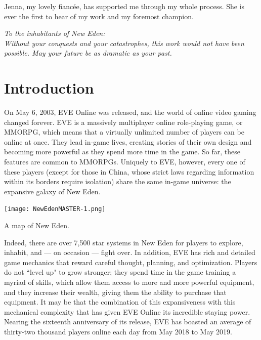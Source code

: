 \documentclass[letterpaper,12pt,article]{memoir}
\begin{document}
Jenna, my lovely fianc\'ee, has supported me through my whole process.
She is ever the first to hear of my work and my foremost champion.
\clearpage

\begin{vplace}[0.6]
\begin{center}
    \textit{To the inhabitants of New Eden: \\
    Without your conquests and your catastrophes, this work would not have 
    been possible. May your future be as dramatic as your past.}
\end{center}
\end{vplace}
\clearpage

\tableofcontents*
\clearpage

\mainmatter
\pagestyle{ruled}
\chapter{Introduction}
\label{sec:intro}

On May 6, 2003, EVE Online was released, and the world of online video gaming
changed forever. EVE is a massively multiplayer online role-playing game, or
MMORPG, which means that a virtually unlimited number of players can be online
at once. They lead in-game lives, creating stories of their own design and
becoming more powerful as they spend more time in the game. So far, these 
features are common to MMORPGs. Uniquely to EVE, however, every one of these
players (except for those in China, whose strict laws regarding information 
within its borders require isolation) share the same in-game universe: the
expansive galaxy of New Eden. 

\begin{myfigure}[blanker]
    \centering
    \captionsetup{type=figure}
    \texttt{[image: NewEdenMASTER-1.png]}
    \caption{A map of New Eden.\cite{EVEmap}}
    \label{fig:map}
\end{myfigure}

Indeed, there are over 7,500 star systems in New Eden for players to explore,
inhabit, and --- on occasion --- fight over. In addition, EVE has rich and
detailed game mechanics that reward careful thought, planning, and optimization.
Players do not ``level up" to grow stronger; they spend time in the game 
training a myriad of skills, which allow them access to more and more powerful
equipment, and they increase their wealth, giving them the ability to purchase
that equipment. It may be that the combination of this expansiveness with this
mechanical complexity that has given EVE Online its incredible staying power.
Nearing the sixteenth anniversary of its release, EVE has boasted an average of
thirty-two thousand players online each day from May 2018 to May 2019.
\cite{EVEcount}
\end{document}
